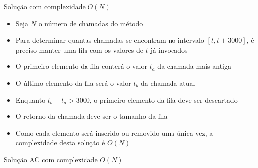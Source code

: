\begin{frame}[fragile]{Solução com complexidade $O(N)$}

    \begin{itemize}
        \item Seja $N$ o número de chamadas do método 

        \item Para determinar quantas chamadas se encontram no intervalo $[t, t + 3000]$, é
            preciso manter uma fila com os valores de $t$ já invocados

        \item O primeiro elemento da fila conterá o valor $t_a$ da chamada mais antiga

        \item O último elemento da fila será o valor $t_b$ da chamada atual

        \item Enquanto $t_b - t_a > 3000$, o primeiro elemento da fila deve ser descartado

        \item O retorno da chamada deve ser o tamanho da fila

        \item Como cada elemento será inserido ou removido uma única vez, a complexidade desta
            solução é $O(N)$

   \end{itemize}

\end{frame}

\begin{frame}[fragile]{Solução AC com complexidade $O(N)$}
\end{frame}
